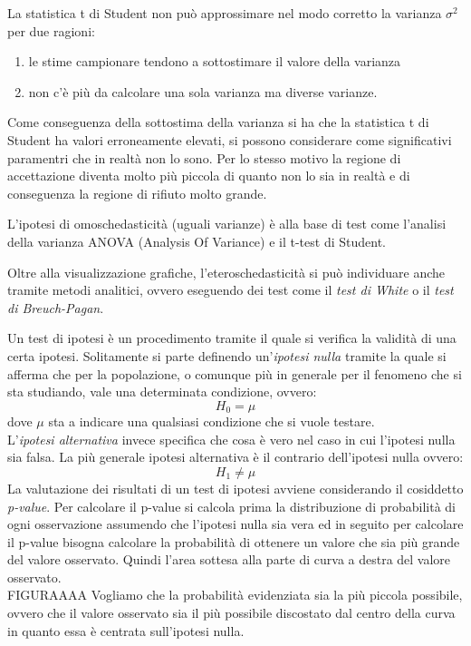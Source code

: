 \documentclass[]{article}
\begin{document}
La statistica t di Student non può approssimare nel modo corretto la varianza $\sigma^2$ per due ragioni:
\begin{enumerate}
\item le stime campionare tendono a sottostimare il valore della varianza
\item non c'è più da calcolare una sola varianza ma diverse varianze.
\end{enumerate}

Come conseguenza della sottostima della varianza si ha che la statistica t di Student ha valori erroneamente elevati, si possono considerare come significativi paramentri che in realtà non lo sono. Per lo stesso motivo la regione di accettazione diventa molto più piccola di quanto non lo sia in realtà e di conseguenza la regione di rifiuto molto grande.

L'ipotesi di omoschedasticità (uguali varianze) è alla base di test come l'analisi della varianza ANOVA (Analysis Of Variance) e il t-test di Student.

Oltre alla visualizzazione grafiche, l'eteroschedasticità si può individuare anche tramite metodi analitici, ovvero eseguendo dei test come il \textit{test di White} o il \textit{test di Breuch-Pagan}.

\begin{tcolorbox}[title = Test di ipotesi e \textit{p-value}]
Un test di ipotesi è un procedimento tramite il quale si verifica la validità di una certa ipotesi. Solitamente si parte definendo un'\textit{ipotesi nulla} tramite la quale si afferma che per la popolazione, o comunque più in generale per il fenomeno che si sta studiando, vale una determinata condizione, ovvero:
\begin{equation}
H_0 = \mu 
\end{equation}
dove $\mu$ sta a indicare una qualsiasi condizione che si vuole testare. \\
L'\textit{ipotesi alternativa} invece specifica che cosa è vero nel caso in cui l'ipotesi nulla sia falsa. La più generale ipotesi alternativa è il contrario dell'ipotesi nulla ovvero:
\begin{equation}
H_1 \neq \mu 
\end{equation}
La valutazione dei risultati di un test di ipotesi avviene considerando il cosiddetto \textit{p-value}. Per calcolare il p-value si calcola prima la distribuzione di probabilità di ogni osservazione assumendo che l'ipotesi nulla sia vera ed in seguito per calcolare il p-value bisogna calcolare la probabilità di ottenere un valore che sia più grande del valore osservato. Quindi l'area sottesa alla parte di curva a destra del valore osservato.\\
FIGURAAAA
Vogliamo che la probabilità evidenziata sia la più piccola possibile, ovvero che il valore osservato sia il più possibile discostato dal centro della curva in quanto essa è centrata sull'ipotesi nulla.
\end{tcolorbox}
\end{document}
